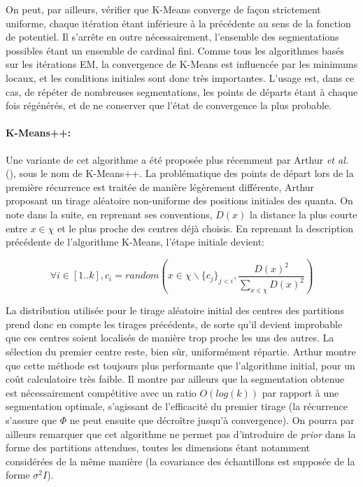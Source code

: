 On peut, par ailleurs, vérifier que K-Means converge de façon strictement uniforme, chaque itération étant inférieure à la précédente au sens de la fonction de potentiel. Il s'arrête en outre nécessairement, l'ensemble des segmentations possibles étant un ensemble de cardinal fini. Comme tous les algorithmes basés sur les itérations EM, la convergence de K-Means est influencée par les minimums locaux, et les conditions initiales sont donc très importantes. L'usage est, dans ce cas, de répéter de nombreuses segmentations, les points de départs étant à chaque fois régénérés, et de ne conserver que l'état de convergence la plus probable.\\

\paragraph{K-Means++:\\}
Une variante de cet algorithme a été proposée plus récemment par Arthur \textit{et al.}(\cite{Arthur}), sous le nom de K-Means++. La problématique des points de départ lors de la première récurrence est traitée de manière légèrement différente, Arthur proposant un tirage aléatoire non-uniforme des positions initiales des quanta. On note dans la suite, en reprenant ses conventions, $D(x)$ la distance la plus courte entre $x \in \chi$ et le plus proche des centres déjà choisis. En reprenant la description précédente de l'algorithme K-Means, l'étape initiale devient:

\begin{equation}
	\forall i \in [1..k], c_i = random(x \in \chi \backslash \{ c_j \}_{j<i}, \frac{D(x)^2}{\sum\limits_{x \in \chi} D(x)^2 })
\end{equation}

La distribution utilisée pour le tirage aléatoire initial des centres des partitions prend donc en compte les tirages précédents, de sorte qu'il devient improbable que ces centres soient localisés de manière trop proche les uns des autres. La sélection du premier centre reste, bien sûr, uniformément répartie. Arthur montre que cette méthode est toujours plus performante que l'algorithme initial, pour un coût calculatoire très faible. Il montre par ailleurs que la segmentation obtenue est nécessairement compétitive avec un ratio $O(log(k))$ par rapport à une segmentation optimale, s'agissant de l'efficacité du premier tirage (la récurrence s'assure que $\Phi$ ne peut ensuite que décroître jusqu'à convergence). On pourra par ailleurs remarquer que cet algorithme ne permet pas d'introduire de \emph{prior} dans la forme des partitions attendues, toutes les dimensions étant notamment considérées de la même manière (la covariance des échantillons est supposée de la forme $\sigma^2 I$). 

